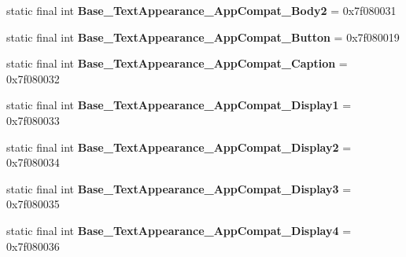 \begin{DoxyCompactItemize}
\item 
\hypertarget{classandroid_1_1support_1_1v7_1_1appcompat_1_1_r_1_1style_a124b888677a509b72b45675f52a2a89a}{}static final int {\bfseries Base\+\_\+\+Text\+Appearance\+\_\+\+App\+Compat\+\_\+\+Body2} = 0x7f080031\label{classandroid_1_1support_1_1v7_1_1appcompat_1_1_r_1_1style_a124b888677a509b72b45675f52a2a89a}

\item 
\hypertarget{classandroid_1_1support_1_1v7_1_1appcompat_1_1_r_1_1style_a827438275a100bb2fb760ef2221d58d0}{}static final int {\bfseries Base\+\_\+\+Text\+Appearance\+\_\+\+App\+Compat\+\_\+\+Button} = 0x7f080019\label{classandroid_1_1support_1_1v7_1_1appcompat_1_1_r_1_1style_a827438275a100bb2fb760ef2221d58d0}

\item 
\hypertarget{classandroid_1_1support_1_1v7_1_1appcompat_1_1_r_1_1style_a2ef1c9b096b9033d2f83f3ac6e9221ec}{}static final int {\bfseries Base\+\_\+\+Text\+Appearance\+\_\+\+App\+Compat\+\_\+\+Caption} = 0x7f080032\label{classandroid_1_1support_1_1v7_1_1appcompat_1_1_r_1_1style_a2ef1c9b096b9033d2f83f3ac6e9221ec}

\item 
\hypertarget{classandroid_1_1support_1_1v7_1_1appcompat_1_1_r_1_1style_adf7dad2dee465c9c31291d46810dad19}{}static final int {\bfseries Base\+\_\+\+Text\+Appearance\+\_\+\+App\+Compat\+\_\+\+Display1} = 0x7f080033\label{classandroid_1_1support_1_1v7_1_1appcompat_1_1_r_1_1style_adf7dad2dee465c9c31291d46810dad19}

\item 
\hypertarget{classandroid_1_1support_1_1v7_1_1appcompat_1_1_r_1_1style_a106d31659ce18797c37ec094836662a5}{}static final int {\bfseries Base\+\_\+\+Text\+Appearance\+\_\+\+App\+Compat\+\_\+\+Display2} = 0x7f080034\label{classandroid_1_1support_1_1v7_1_1appcompat_1_1_r_1_1style_a106d31659ce18797c37ec094836662a5}

\item 
\hypertarget{classandroid_1_1support_1_1v7_1_1appcompat_1_1_r_1_1style_a0380dc8d70a5eb7c2607df2a22960d42}{}static final int {\bfseries Base\+\_\+\+Text\+Appearance\+\_\+\+App\+Compat\+\_\+\+Display3} = 0x7f080035\label{classandroid_1_1support_1_1v7_1_1appcompat_1_1_r_1_1style_a0380dc8d70a5eb7c2607df2a22960d42}

\item 
\hypertarget{classandroid_1_1support_1_1v7_1_1appcompat_1_1_r_1_1style_a6cddb219261317aad3f4db784e410f78}{}static final int {\bfseries Base\+\_\+\+Text\+Appearance\+\_\+\+App\+Compat\+\_\+\+Display4} = 0x7f080036\label{classandroid_1_1support_1_1v7_1_1appcompat_1_1_r_1_1style_a6cddb219261317aad3f4db784e410f78}


\end{DoxyCompactItemize}
